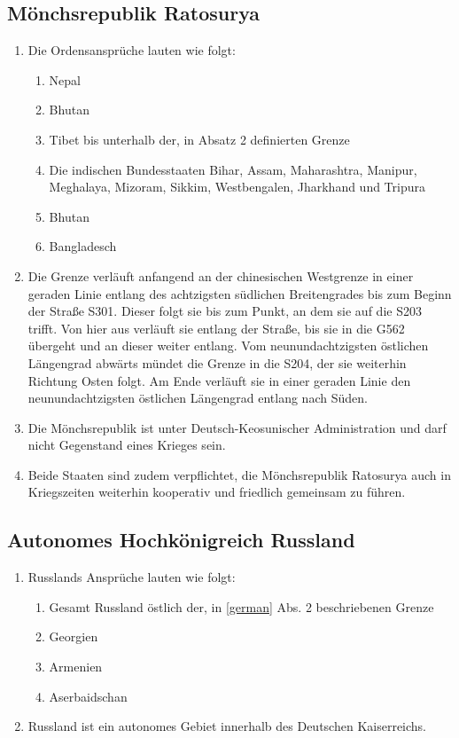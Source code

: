 \documentclass{article}
\begin{document}
\subsection{Mönchsrepublik Ratosurya}\label{order}
\begin{enumerate}[(1)]
    \item Die Ordensansprüche lauten wie folgt:
    \begin{enumerate}[1.]
        \item Nepal
        \item Bhutan
        \item Tibet bis unterhalb der, in Absatz 2 definierten Grenze
        \item Die indischen Bundesstaaten Bihar, Assam, Maharashtra, Manipur, Meghalaya, Mizoram, Sikkim, Westbengalen, Jharkhand und Tripura
        \item Bhutan
        \item Bangladesch
    \end{enumerate}
    \item Die Grenze verläuft anfangend an der chinesischen Westgrenze in einer geraden Linie entlang des achtzigsten südlichen Breitengrades
    bis zum Beginn der Straße S301. Dieser folgt sie bis zum Punkt, an dem sie auf die S203 trifft. Von hier aus verläuft sie entlang der Straße,
    bis sie in die G562 übergeht und an dieser weiter entlang. Vom neunundachtzigsten östlichen Längengrad abwärts mündet die Grenze in die S204, der sie weiterhin Richtung Osten folgt.
    Am Ende verläuft sie in einer geraden Linie den neunundachtzigsten östlichen Längengrad entlang nach Süden. 
    \item Die Mönchsrepublik ist unter Deutsch-Keosunischer Administration und darf nicht Gegenstand eines Krieges sein.
    \item Beide Staaten sind zudem verpflichtet, die Mönchsrepublik Ratosurya auch in Kriegszeiten weiterhin kooperativ und friedlich gemeinsam zu führen.
\end{enumerate}

\subsection{Autonomes Hochkönigreich Russland}
\begin{enumerate}[(1)]
    \item Russlands Ansprüche lauten wie folgt:
    \begin{enumerate}[1.]
        \item Gesamt Russland östlich der, in \ref{german} Abs. 2 beschriebenen Grenze
        \item Georgien
        \item Armenien
        \item Aserbaidschan
    \end{enumerate}
    \item Russland ist ein autonomes Gebiet innerhalb des Deutschen Kaiserreichs.
\end{enumerate}
\end{document}
